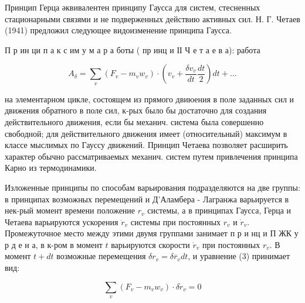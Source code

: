 \documentclass[10pt]{article}
\begin{document}
Принцип Герца әквивалентен принципу Гаусса для систем, стесненных стационарными связями и не подверженных действию активных сил. Н. Г. Четаев (1941) предложил следующее видоизменение принципа Гаусса.



П р ин ци п а к с им у м а р а боты ( пр инц и ІІ Ч е т а е в а): работа



\[

A_{\delta}=\sum_{v}\left(F_{v}-m_{v} w_{v}\right) \cdot\left(v_{v}+\frac{\delta v_{v}}{d t} \frac{d t}{2}\right) d t+\ldots

\]



на элементарном цикле, состоящем из прямого двиюения в поле заданных сил и движения обратного в поле сил, к-рых было бы достаточно для создания действительного движения, если бы механич. система была совершенно свободной; для действительного движения имеет (относительный) максимум в классе мыслимых по Гауссу движений. Принцип Четаева позволяет расширить характер обычно рассматриваемых механич. систем путем привлечения принципа Карно из термодинамики.



Изложенные принципы по способам варьирования подразделяются на две группы: в принципах возможных перемещений и Д'Аламбера - Лагранжа варьируется в нек-рый момент времени положение $r_{v}$ системы, а в принципах Гаусса, Герца и Четаева варьируются ускорения $\ddot{r}_{v}$ системы при постоянных $r_{v}$ и $\dot{r}_{v}$. Промежуточное место между этими двумя группами занимает п р и нц и П ЖК у р д е н а, в к-ром в момент $t$ варьируются скорости $\dot{r}_{v}$ при постоянных $r_{v}$. В момент $t+d t$ возможные перемещения $\delta r_{v}=\delta \ddot{r_{v}} d t$, и уравнение (3) принимает вид:



\[

\sum_{v}\left(F_{v}-m_{v} w_{v}\right) \cdot \delta \dot{r}_{v}=0

\]
\end{document}
